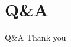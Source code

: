 \documentclass[12pt]{phage3slides} %
\begin{document}
\section{Q\&A}
\begin{frame}{Q\&A}
	Thank you \\\ \\
	\begin{center}
		\begin{tabular}{rl}
			\end{tabular}\\[1cm]
			\fundingNSFABIannotation
	\end{center}
\end{frame}
\end{document}
